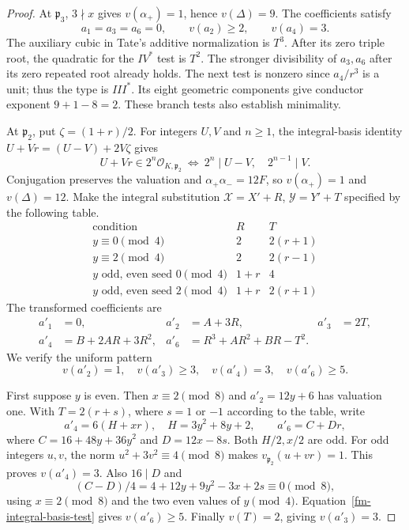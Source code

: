 \begin{proof}
At $\mathfrak p_3$, $3\nmid x$ gives $v(\alpha_+)=1$, hence
$v(\Delta)=9$. The coefficients satisfy
\[
 a_1=a_3=a_6=0,\qquad v(a_2)\ge2,\qquad v(a_4)=3.
\]
The auxiliary cubic in Tate's additive normalization is $T^3$.
After its zero triple root, the quadratic for the $IV^*$ test is $T^2$.
The stronger divisibility of $a_3,a_6$ after its zero repeated root
already holds. The next test is nonzero since $a_4/r^3$ is a unit;
thus the type is $III^*$. Its eight geometric components give conductor
exponent $9+1-8=2$. These branch tests also establish minimality.

At $\mathfrak p_2$, put $\zeta=(1+r)/2$. For integers $U,V$ and $n\ge1$,
the integral-basis identity $U+Vr=(U-V)+2V\zeta$ gives
\begin{equation}\label{fm-integral-basis-test}
 U+Vr\in2^n\mathcal O_{K,\mathfrak p_2}
 \ \Longleftrightarrow\ 2^n\mid U-V,\quad 2^{n-1}\mid V.
\end{equation}
Conjugation preserves the valuation and $\alpha_+\alpha_-=12F$, so
$v(\alpha_+)=1$ and $v(\Delta)=12$.
Make the integral substitution $\mathcal X=X'+R$, $\mathcal Y=Y'+T$
specified by the following table.
\[
\begin{array}{c|c|c}
\text{condition}&R&T\\ \hline
y\equiv0\pmod4&2&2(r+1)\\
y\equiv2\pmod4&2&2(r-1)\\
y\text{ odd, even seed }0\pmod4&1+r&4\\
y\text{ odd, even seed }2\pmod4&1+r&2(r+1)
\end{array}
\]
The transformed coefficients are
\begin{equation}\label{fm-transformed-coefficients}
\begin{aligned}
 a'_1&=0,&a'_2&=A+3R,&a'_3&=2T,\\
 a'_4&=B+2AR+3R^2,&
 a'_6&=R^3+AR^2+BR-T^2.
\end{aligned}
\end{equation}
We verify the uniform pattern
\begin{equation}\label{fm-tate-pattern}
 v(a'_2)=1,\quad v(a'_3)\ge3,\quad v(a'_4)=3,\quad v(a'_6)\ge5.
\end{equation}

First suppose $y$ is even. Then $x\equiv2\pmod8$ and $a'_2=12y+6$
has valuation one. With $T=2(r+s)$, where $s=1$ or $-1$ according to
the table, write
\[
 a'_4=6(H+xr),\quad H=3y^2+8y+2,
 \qquad
 a'_6=C+Dr,
\]
where $C=16+48y+36y^2$ and $D=12x-8s$.
Both $H/2,x/2$ are odd. For odd integers $u,v$, the norm
$u^2+3v^2\equiv4\pmod8$ makes $v_{\mathfrak p_2}(u+vr)=1$.
This proves $v(a'_4)=3$. Also $16\mid D$ and
\[
 (C-D)/4=4+12y+9y^2-3x+2s\equiv0\pmod8,
\]
using $x\equiv2\pmod8$ and the two even values of $y\pmod4$.
Equation~\eqref{fm-integral-basis-test} gives $v(a'_6)\ge5$.
Finally $v(T)=2$, giving $v(a'_3)=3$.


\end{proof}
